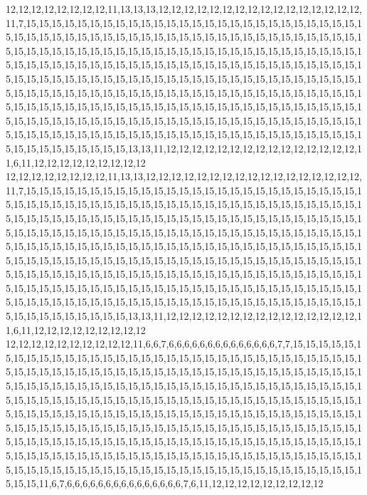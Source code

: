 12,12,12,12,12,12,12,12,11,13,13,13,12,12,12,12,12,12,12,12,12,12,12,12,12,12,12,12,11,7,15,15,15,15,15,15,15,15,15,15,15,15,15,15,15,15,15,15,15,15,15,15,15,15,15,15,15,15,15,15,15,15,15,15,15,15,15,15,15,15,15,15,15,15,15,15,15,15,15,15,15,15,15,15,15,15,15,15,15,15,15,15,15,15,15,15,15,15,15,15,15,15,15,15,15,15,15,15,15,15,15,15,15,15,15,15,15,15,15,15,15,15,15,15,15,15,15,15,15,15,15,15,15,15,15,15,15,15,15,15,15,15,15,15,15,15,15,15,15,15,15,15,15,15,15,15,15,15,15,15,15,15,15,15,15,15,15,15,15,15,15,15,15,15,15,15,15,15,15,15,15,15,15,15,15,15,15,15,15,15,15,15,15,15,15,15,15,15,15,15,15,15,15,15,15,15,15,15,15,15,15,15,15,15,15,15,15,15,15,15,15,15,15,15,15,15,15,15,15,15,15,15,15,15,15,15,15,15,15,15,15,15,15,15,15,15,15,15,15,15,15,15,15,15,15,15,15,15,15,15,15,15,15,15,15,15,15,15,15,15,15,15,15,15,15,15,15,15,15,15,15,15,15,15,15,15,15,15,15,15,13,13,11,12,12,12,12,12,12,12,12,12,12,12,12,12,12,12,11,6,11,12,12,12,12,12,12,12,12,12
12,12,12,12,12,12,12,12,11,13,13,12,12,12,12,12,12,12,12,12,12,12,12,12,12,12,12,12,11,7,15,15,15,15,15,15,15,15,15,15,15,15,15,15,15,15,15,15,15,15,15,15,15,15,15,15,15,15,15,15,15,15,15,15,15,15,15,15,15,15,15,15,15,15,15,15,15,15,15,15,15,15,15,15,15,15,15,15,15,15,15,15,15,15,15,15,15,15,15,15,15,15,15,15,15,15,15,15,15,15,15,15,15,15,15,15,15,15,15,15,15,15,15,15,15,15,15,15,15,15,15,15,15,15,15,15,15,15,15,15,15,15,15,15,15,15,15,15,15,15,15,15,15,15,15,15,15,15,15,15,15,15,15,15,15,15,15,15,15,15,15,15,15,15,15,15,15,15,15,15,15,15,15,15,15,15,15,15,15,15,15,15,15,15,15,15,15,15,15,15,15,15,15,15,15,15,15,15,15,15,15,15,15,15,15,15,15,15,15,15,15,15,15,15,15,15,15,15,15,15,15,15,15,15,15,15,15,15,15,15,15,15,15,15,15,15,15,15,15,15,15,15,15,15,15,15,15,15,15,15,15,15,15,15,15,15,15,15,15,15,15,15,15,15,15,15,15,15,15,15,15,15,15,15,15,15,15,15,15,15,13,13,11,12,12,12,12,12,12,12,12,12,12,12,12,12,12,12,11,6,11,12,12,12,12,12,12,12,12,12
12,12,12,12,12,12,12,12,12,12,11,6,6,7,6,6,6,6,6,6,6,6,6,6,6,6,6,6,7,7,15,15,15,15,15,15,15,15,15,15,15,15,15,15,15,15,15,15,15,15,15,15,15,15,15,15,15,15,15,15,15,15,15,15,15,15,15,15,15,15,15,15,15,15,15,15,15,15,15,15,15,15,15,15,15,15,15,15,15,15,15,15,15,15,15,15,15,15,15,15,15,15,15,15,15,15,15,15,15,15,15,15,15,15,15,15,15,15,15,15,15,15,15,15,15,15,15,15,15,15,15,15,15,15,15,15,15,15,15,15,15,15,15,15,15,15,15,15,15,15,15,15,15,15,15,15,15,15,15,15,15,15,15,15,15,15,15,15,15,15,15,15,15,15,15,15,15,15,15,15,15,15,15,15,15,15,15,15,15,15,15,15,15,15,15,15,15,15,15,15,15,15,15,15,15,15,15,15,15,15,15,15,15,15,15,15,15,15,15,15,15,15,15,15,15,15,15,15,15,15,15,15,15,15,15,15,15,15,15,15,15,15,15,15,15,15,15,15,15,15,15,15,15,15,15,15,15,15,15,15,15,15,15,15,15,15,15,15,15,15,15,15,15,15,15,15,15,15,15,15,15,15,15,15,15,15,15,15,15,15,11,6,7,6,6,6,6,6,6,6,6,6,6,6,6,6,6,6,7,6,11,12,12,12,12,12,12,12,12,12
